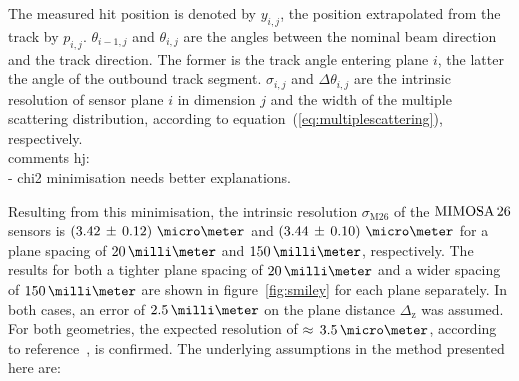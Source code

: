 \noindent The measured hit position is denoted by $y_{i,j}$, the position extrapolated from the track by $p_{i,j}$. $\theta_{i-1,j}$ and $\theta_{i,j}$ are the angles between the nominal beam direction
 and the track direction. The former is the track angle entering plane $i$, the latter the angle of the outbound track segment.
$\sigma_{i,j}$ and $\Delta \theta_{i,j}$ are the intrinsic resolution of sensor plane $i$ in dimension $j$ and the width of the multiple scattering distribution,
 according to equation~(\ref{eq:multiplescattering}), respectively.
\\comments hj: \\
- chi2 minimisation needs better explanations. 

Resulting from this minimisation, the intrinsic resolution $\sigma_{\textrm{M26}}$ of the $\textrm{MIMOSA\,26}$ sensors is \allowbreak$\left( 3.42\,\pm\, \allowbreak 0.12 \right)\,\micro\meter$
 and $\left( 3.44\,\pm\,0.10 \right)\,\micro\meter$ for a plane spacing of $20\,\milli\meter$ and $150\,\milli\meter$, respectively.
The results for both a tighter plane spacing of $20\,\milli\meter$ and a wider spacing of $150\,\milli\meter$ are shown in figure~\ref{fig:smiley} for each plane separately. 
In both cases, an error of $2.5\,\milli\meter$ on the plane distance $\Delta_{\textrm{z}}$ was assumed.
For both geometries, the expected resolution of $\approx\,3.5\,\micro\meter$, according to reference~\cite{ref:mimosa26}, is confirmed.
The underlying assumptions in the method presented here are:

